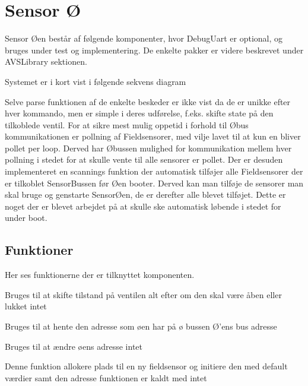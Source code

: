 \section{Sensor Ø}

Sensor Øen består af følgende komponenter, 
hvor DebugUart er optional, og bruges under 
test og implementering. De enkelte pakker er 
videre beskrevet under AVSLibrary sektionen.


Systemet er i kort vist i følgende sekvens diagram


Selve parse funktionen af de enkelte beskeder er ikke 
vist da de er unikke efter hver kommando, men er simple 
i deres udførelse, f.eks. skifte state på den tilkoblede 
ventil. For at sikre mest mulig oppetid i forhold til 
Øbus kommunikationen er pollning af Fieldsensorer, med 
vilje lavet til at kun en bliver pollet per loop. Derved 
har Øbussen mulighed for kommunikation mellem hver pollning 
i stedet for at skulle vente til alle sensorer er pollet. 
Der er desuden implementeret en scannings funktion der 
automatisk tilføjer alle Fieldsensorer der er tilkoblet 
SensorBussen før Øen booter. Derved kan man tilføje de 
sensorer man skal bruge og genstarte SensorØen, de er 
derefter alle blevet tilføjet. Dette er noget der er 
blevet arbejdet på at skulle ske automatisk løbende i 
stedet for under boot.

\subsection{Funktioner}
Her ses funktionerne der er tilknyttet komponenten.

{Bruges til at skifte tilstand på ventilen alt efter om den skal være åben eller lukket}
{intet}
{
}

{Bruges til at hente den adresse som øen har på ø bussen}
{Ø'ens bus adresse}
{
}

{Bruges til at ændre øens adresse}
{intet}
{
}

{Denne funktion allokere plads til en ny fieldsensor og initiere den med default værdier samt den adresse funktionen er kaldt med}
{intet}
{
}

